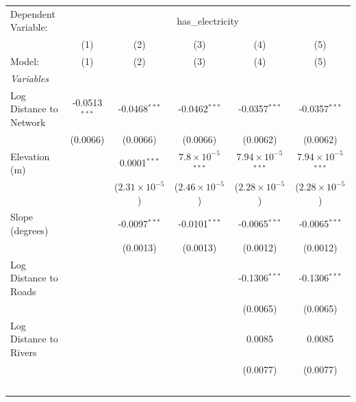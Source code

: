 
\begingroup
\centering
\begin{tabular}{lccccc}
   \tabularnewline \midrule \midrule
   Dependent Variable: & \multicolumn{5}{c}{has\_electricity}\\
                           & (1)             & (2)                     & (3)                          & (4)                           & (5) \\   
   Model:                  & (1)             & (2)                     & (3)                          & (4)                           & (5)\\  
   \midrule
   \emph{Variables}\\
   Log Distance to Network & -0.0513$^{***}$ & -0.0468$^{***}$         & -0.0462$^{***}$              & -0.0357$^{***}$               & -0.0357$^{***}$\\   
                           & (0.0066)        & (0.0066)                & (0.0066)                     & (0.0062)                      & (0.0062)\\   
   Elevation (m)           &                 & 0.0001$^{***}$          & $7.8\times 10^{-5}$$^{***}$  & $7.94\times 10^{-5}$$^{***}$  & $7.94\times 10^{-5}$$^{***}$\\    
                           &                 & ($2.31\times 10^{-5}$)  & ($2.46\times 10^{-5}$)       & ($2.28\times 10^{-5}$)        & ($2.28\times 10^{-5}$)\\    
   Slope (degrees)         &                 & -0.0097$^{***}$         & -0.0101$^{***}$              & -0.0065$^{***}$               & -0.0065$^{***}$\\   
                           &                 & (0.0013)                & (0.0013)                     & (0.0012)                      & (0.0012)\\   
   Log Distance to Roads   &                 &                         &                              & -0.1306$^{***}$               & -0.1306$^{***}$\\   
                           &                 &                         &                              & (0.0065)                      & (0.0065)\\   
   Log Distance to Rivers  &                 &                         &                              & 0.0085                        & 0.0085\\   
                           &                 &                         &                              & (0.0077)                      & (0.0077)\\   
$$
\end{tabular}
